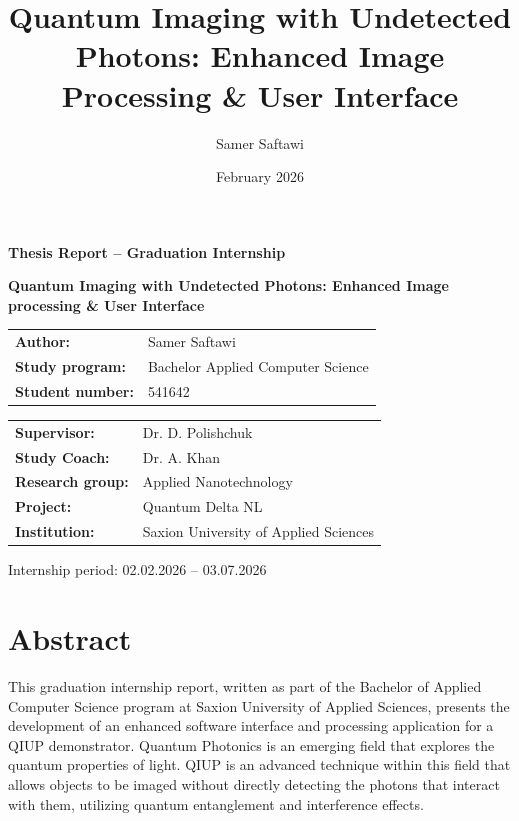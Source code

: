 \documentclass[12pt,a4paper]{article}
\title{Quantum Imaging with Undetected Photons: Enhanced Image Processing \& User Interface}
\author{Samer Saftawi}
\date{February 2026}
\begin{document}
\begin{titlepage}
\centering

\vspace*{2cm}

{\Large\bfseries Thesis Report -- Graduation Internship\par}
\vspace{1.2cm}

{\Huge\bfseries Quantum Imaging with Undetected Photons: Enhanced Image processing \& User Interface\par}

\vspace{4cm}

{\large
\begin{tabular}{@{}l l@{}}
\textbf{Author:} & Samer Saftawi \\
\textbf{Study program:} & Bachelor Applied Computer Science \\
\textbf{Student number:} & 541642 \\
\end{tabular}
}

\vspace{1.5cm}

{\large
\begin{tabular}{@{}l l@{}}
\textbf{Supervisor:} & Dr. D. Polishchuk \\
\textbf{Study Coach:} & Dr. A. Khan \\
\textbf{Research group:} & Applied Nanotechnology \\
\textbf{Project:} & Quantum Delta NL \\
\textbf{Institution:} & Saxion University of Applied Sciences \\
\end{tabular}
}

\vfill

{\large
Internship period: 02.02.2026 -- 03.07.2026\\
}

\end{titlepage}

\newpage

\section*{Abstract}
This graduation internship report, written as part of the Bachelor of Applied Computer Science program at Saxion University of Applied Sciences, presents the development of an enhanced software interface and processing application for a \ac{QIUP} demonstrator. Quantum Photonics is an emerging field that explores the quantum properties of light. \ac{QIUP} is an advanced technique within this field that allows objects to be imaged without directly detecting the photons that interact with them, utilizing quantum entanglement and interference effects. 
\end{document}
